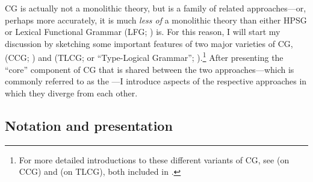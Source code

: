 \documentclass[output=paper
                ,modfonts
                ,nonflat
	        ,collection
	        ,collectionchapter
	        ,collectiontoclongg
 	        ,biblatex
                ,babelshorthands
                ,newtxmath
                ,draftmode
                ,colorlinks, citecolor=brown
]{./langsci/langscibook}
\begin{document}
CG is actually not a monolithic theory, but is a family of related
approaches---or, perhaps more accurately, it is much \emph{less of} a
monolithic theory than either HPSG or Lexical Functional Grammar (LFG;
\citealt{KB82a-u,BATW2015a}) is. For this reason, I will
start my discussion by sketching some important features of two major
varieties of CG,  (CCG;
\citealt{Steedman2000a-u,steedman2012}) and 
(TLCG; or ``Type-Logical Grammar'';
\citealt{Morrill94a-u,Moortgat2011a-u,KubotaLevineBook}).\footnote{For 
more detailed introductions to these different variants of CG, see 
\citet{steedman2011ccg} (on CCG) and \citet{oehrle2011} (on 
TLCG), both included in \citet{BB2011a}.} After presenting the ``core''
component of CG that is shared between the two approaches---which is
commonly referred to as the ---I introduce
aspects of the respective approaches in which they diverge from each
other.


\subsection{Notation and presentation }
\end{document}
